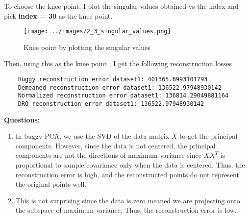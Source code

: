 \documentclass[a4paper]{article}
\theoremstyle{definition}
\begin{document}
To choose the knee point, I plot the singular values obtained vs the index and pick \textbf{index = 30} as the knee point. \\
\begin{figure}[H]
    \centering
    \texttt{[image: ../images/2\_3\_singular\_values.png]}
    \caption{Knee point by plotting the singular values}
    \label{fig:rec_1000d}
\end{figure}

Then, using this as the knee point , I get the following reconstruction losses
\begin{verbatim}
    Buggy reconstruction error dataset1: 401365.6993101793
    Demeaned reconstruction error dataset1: 136522.97948930142
    Normalized reconstruction error dataset1: 136814.29049881164
    DRO reconstruction error dataset1: 136522.97948930142
\end{verbatim}


\textbf{Questions: }\\
\begin{enumerate}
    \item In buggy PCA, we use the SVD of the data matrix $X$ to get the principal components. However, since the data is not centered, the principal components are not the directions of maximum variance since $XX^T$ is proportional to sample covariance only when the data is centered. Thus, the reconstruction error is high, and the reconstructed points do not represent the original points well.
    \item This is not surprising since the data is zero meaned we are projecting onto the subspace of maximum variance. Thus, the reconstruction error is low.
\end{enumerate}





\end{document}
